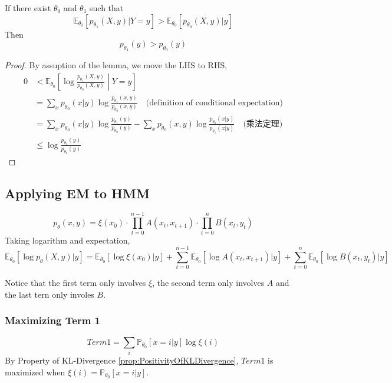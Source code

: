         \begin{lemma}\label{lem:IncreasingLowerBoundOfEMAlgo}
            If there exist $\theta_0$ and $\theta_1$ such that
            \[ \mathbb{E}_{\theta_0}[p_{\theta_1}(X,y)|Y=y] > \mathbb{E}_{\theta_0}[p_{\theta_0}(X,y)|y] \]
            Then
            \[ p_{\theta_1}(y) > p_{\theta_0}(y) \]
        \end{lemma}
        \begin{proof}
            By assuption of the lemma, we move the LHS to RHS,
            \begin{align*}
                0 &< \mathbb{E}_{\theta_0}\left[ \log \frac{p_{\theta_1}(X,y)}{p_{\theta_0}(X,y)} \middle\vert Y=y \right]\\
                &= \sum_x p_{\theta_0}(x|y) \log \frac{p_{\theta_1}(x,y)}{p_{\theta_0}(x,y)} \quad \text{(definition of conditional expectation)}\\
                &= \sum_x p_{\theta_0}(x|y) \log \frac{p_{\theta_1}(y)}{p_{\theta_0}(y)} - \sum_x p_{\theta_0}(x,y)\log\frac{p_{\theta_0}(x|y)}{p_{\theta_1}(x|y)} \quad \text{(乘法定理)} \\
                &\le \log\frac{p_{\theta_1}(y)}{p_{\theta_0}(y)}
            \end{align*}
        \end{proof}

    \subsection{Applying EM to HMM}
        \[ p_{\theta}(x,y) = \xi(x_0) \cdot \prod_{t=0}^{n-1}A(x_t,x_{t+1}) \cdot \prod_{t=0}^n B(x_t, y_t) \]
        Taking logarithm and expectation,
        \[ \mathbb{E}_{\theta_0}\left[ \log p_{\theta}(X,y)|y \right] = \mathbb{E}_{\theta_0}[\log\xi(x_0)|y] + \sum_{t=0}^{n-1}\mathbb{E}_{\theta_0}[\log A(x_t,x_{t+1})|y] + \sum_{t=0}^n\mathbb{E}_{\theta_0}[\log B(x_t,y_t)|y] \]

        Notice that the first term only involves $\xi$, the second term only involves $A$ and the last tern only involes $B$.

        \subsubsection{Maximizing Term 1}
        \[ Term1 = \sum_i \mathbb{P}_{\theta_0}[x=i|y]\log\xi(i) \]
        By Property of KL-Divergence \ref{prop:PositivityOfKLDivergence}, $Term1$ is maximized when $\xi(i) = \mathbb{P}_{\theta_0}[x=i|y]$.


